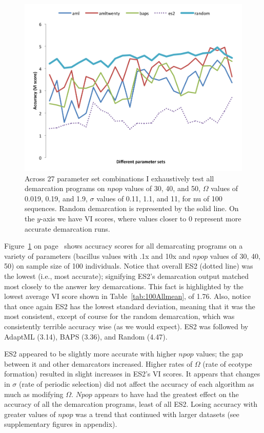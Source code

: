 \begin{figure}[h!]
  \centering
    \includegraphics[scale=0.75]{images/ResultGraphs/ResultGraphs-2}
      \caption[All demarcation graphical accuracy visualization on $nu = 100$.]{Across 27 parameter set combinations I exhaustively test all demarcation programs on $npop$ values of 30, 40, and 50, $\Omega$ values of 0.019, 0.19, and 1.9, $\sigma$ values of 0.11, 1.1, and 11, for nu of 100 sequences. Random demarcation is represented by the solid line. On the $y$-axis we have VI scores, where values closer to 0 represent more accurate demarcation runs.}
    \label{fig:All100}
\end{figure}

Figure~\ref{fig:All100} on page~\pageref{fig:All100} shows accuracy scores for all demarcating programs on a variety of parameters (bacillus values with .1x and 10x and $npop$ values of 30, 40, 50) on sample size of 100 individuals.
Notice that overall ES2 (dotted line) was the lowest (i.e., most accurate); signifying ES2's demarcation output matched most closely to the answer key demarcations.
This fact is highlighted by the lowest average VI score shown in Table~\ref{tab:100Allmean}, of 1.76.
Also, notice that once again ES2 has the lowest standard deviation, meaning that it was the most consistent, except of course for the random demarcation, which was consistently terrible accuracy wise (as we would expect).
ES2 was followed by AdaptML (3.14), BAPS (3.36), and Random (4.47).

ES2 appeared to be slightly more accurate with higher $npop$ values; the gap between it and other demarcators increased.
Higher rates of $\Omega$ (rate of ecotype formation) resulted in slight increases in ES2's VI scores.
It appears that changes in $\sigma$ (rate of periodic selection) did not affect the accuracy of each algorithm as much as modifying $\Omega$.
$Npop$ appears to have had the greatest effect on the accuracy of all the demarcation programs, least of all ES2.
Losing accuracy with greater values of $npop$ was a trend that continued with larger datasets (see supplementary figures in appendix).

